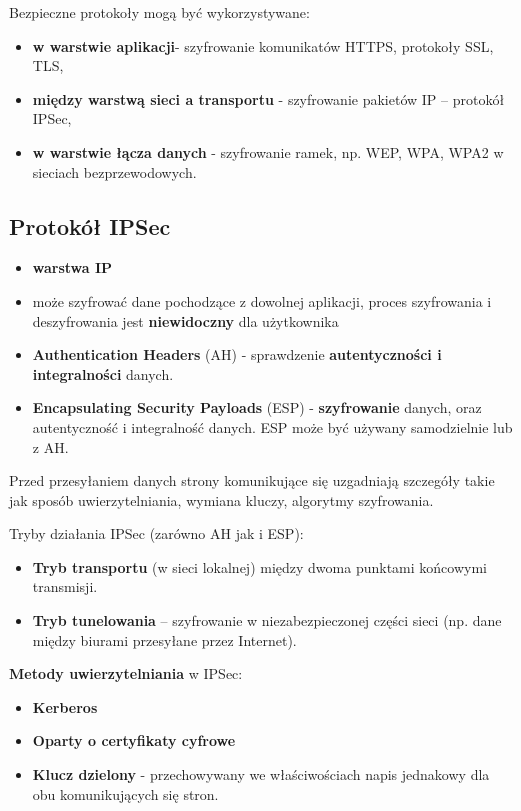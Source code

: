 \documentclass[../main.tex]{subfiles}
\begin{document}
    Bezpieczne protokoły mogą być wykorzystywane:
    \begin{itemize}
        \item \textbf{w warstwie aplikacji}- szyfrowanie komunikatów HTTPS, protokoły SSL, TLS,
        \item \textbf{między warstwą sieci a transportu} - szyfrowanie pakietów IP – protokół IPSec,
        \item \textbf{w warstwie łącza danych} - szyfrowanie ramek, np. WEP, WPA, WPA2 w sieciach bezprzewodowych.
    \end{itemize}


    \subsection{Protokół IPSec}
    \begin{itemize}
        \item \textbf{warstwa IP}
        \item może szyfrować dane pochodzące z dowolnej
        aplikacji, proces szyfrowania i deszyfrowania jest \textbf{niewidoczny} dla użytkownika
        \item \textbf{Authentication Headers} (AH) - sprawdzenie \textbf{autentyczności i integralności} danych.
        \item \textbf{Encapsulating Security Payloads} (ESP) - \textbf{szyfrowanie} danych, oraz autentyczność i integralność danych. ESP może być
        używany samodzielnie lub z AH.
    \end{itemize}

    Przed przesyłaniem danych strony komunikujące się uzgadniają szczegóły takie jak sposób
    uwierzytelniania, wymiana kluczy, algorytmy szyfrowania.

    Tryby działania IPSec (zarówno AH jak i ESP):
    \begin{itemize}
        \item \textbf{Tryb transportu} (w sieci lokalnej) między dwoma punktami końcowymi transmisji.
        \item \textbf{Tryb tunelowania} – szyfrowanie w niezabezpieczonej części sieci (np. dane między
        biurami przesyłane przez Internet).
    \end{itemize}

    \textbf{Metody uwierzytelniania} w IPSec:
    \begin{itemize}
        \item \textbf{Kerberos}
        \item \textbf{Oparty o certyfikaty cyfrowe}
        \item \textbf{Klucz dzielony} - przechowywany we właściwościach napis jednakowy dla obu
        komunikujących się stron.
    \end{itemize}
\end{document}
